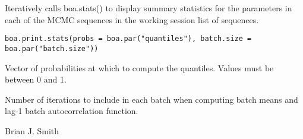\begin{Description}\relax
Iteratively calls boa.stats() to display summary statistics for the 
parameters in each of the MCMC sequences in the working session list of 
sequences.
\end{Description}
\begin{Usage}
\begin{verbatim}
boa.print.stats(probs = boa.par("quantiles"), batch.size = boa.par("batch.size"))
\end{verbatim}
\end{Usage}
\begin{Arguments}
\begin{ldescription}
\item[\code{probs}] Vector of probabilities at which to compute the quantiles. 
Values must be between 0 and 1.
\item[\code{batch.size}] Number of iterations to include in each batch when computing 
batch means and lag-1 batch autocorrelation function.
\end{ldescription}
\end{Arguments}
\begin{Author}\relax
Brian J. Smith
\end{Author}
\begin{SeeAlso}\relax
{}
\end{SeeAlso}

